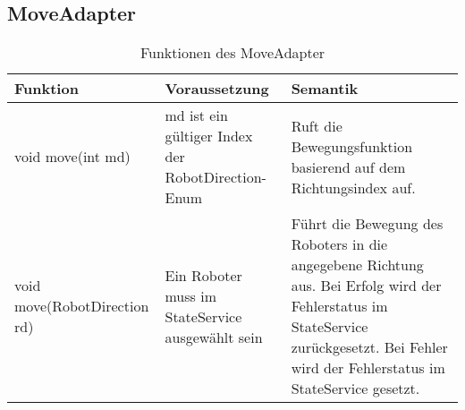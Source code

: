 \clearpage

    \subsection{MoveAdapter}
    \begin{table}[h!]
        \centering
        \begin{tabular}{|p{5cm}|p{5cm}|p{5cm}|}
            \hline
            \textbf{Funktion} & \textbf{Voraussetzung} & \textbf{Semantik} \\
            \hline
            void move(int md) & md ist ein gültiger Index der RobotDirection-Enum & Ruft die Bewegungsfunktion basierend auf dem Richtungsindex auf. \\
            \hline
            void move(RobotDirection rd) & Ein Roboter muss im StateService ausgewählt sein & Führt die Bewegung des Roboters in die angegebene Richtung aus. Bei Erfolg wird der Fehlerstatus im StateService zurückgesetzt. Bei Fehler wird der Fehlerstatus im StateService gesetzt. \\
            \hline
        \end{tabular}
        \caption{Funktionen des MoveAdapter}
        \label{tab:MoveAdapter}
    \end{table}



